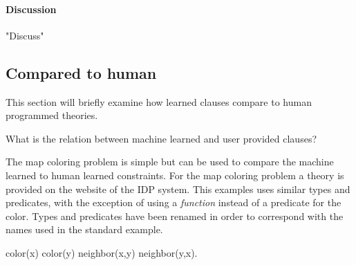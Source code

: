\paragraph{Discussion}
"Discuss"

\subsection{Compared to human}

This section will briefly examine how learned clauses compare to human programmed theories.

\begin{question}
	What is the relation between machine learned and user provided clauses?
\end{question}

\begin{experiment}
\label{exp:cd_user_show}
	The map coloring problem is simple but can be used to compare the machine learned to human learned constraints.
	For the map coloring problem a theory is provided on the website of the IDP system.
	This examples uses similar types and predicates, with the exception of using a \emph{function} instead of a predicate for the color.
	Types and predicates have been renamed in order to correspond with the names used in the standard example.  

	\begin{shiftedflalign*}
		color(x) \neq color(y) \leftarrow neighbor(x,y) \lor neighbor(y,x).
	\end{shiftedflalign*}

\end{experiment}


